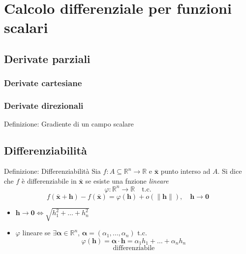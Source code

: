 \documentclass[x11names]{article}
\begin{document}

\newpage
\section{Calcolo differenziale per funzioni scalari}
	
	
	\subsection{Derivate parziali}
	
		\subsubsection{Derivate cartesiane}
		\subsubsection{Derivate direzionali}

		\begin{center}
		\colorbox{myblue}{\begin{minipage}{5.75in}
			\begin{blues}{Definizione: Gradiente di un campo scalare}
			\end{blues}
		\end{minipage}}       
		\end{center}

	\subsection{Differenziabilità}
		\begin{center}
		\colorbox{myblue}{\begin{minipage}{5.75in}
			\begin{blues}{Definizione: Differenziabilità}
				Sia \(f: A\subseteq \mathbb{R}^n \to \mathbb{R}\) e \(\boldsymbol{\bar{x}}\) punto interso ad \(A\). Si dice che \(f\) è differenziabile in \(\boldsymbol{\bar{x}}\) se esiste una fnzione \textit{lineare}
				\[ 
				\varphi: \mathbb{R}^n \to \mathbb{R} \quad \text{t.c.}
				\]
				\[ 
				f(\boldsymbol{\bar{x}} + \boldsymbol{h}) - f(\boldsymbol{\bar{x}}) = \varphi(\boldsymbol{h}) + o(\|\boldsymbol{h}\|), \quad \boldsymbol{h} \to \boldsymbol{0} 
				\]
				\begin{itemize}
					\item \(\boldsymbol{h} \to \boldsymbol{0} \Longleftrightarrow \sqrt{h_{1}^2 + \dots + h_{n}^2}\)
					\item \(\varphi\) lineare se \(\exists \boldsymbol{\alpha} \in \mathbb{R}^n\), \(\boldsymbol{\alpha} = (\alpha_1, \dots, \alpha_{n})\) t.c. 
					\[ 
					\varphi(\boldsymbol{h}) = \boldsymbol{\alpha} \cdot \boldsymbol{h} = \alpha_1 h_{1} + \dots + \alpha_n h_{n}
					\]
					\[ 
					\text{differenziabile}
					\]
				\end{itemize}
			\end{blues}
		\end{minipage}}       
		\end{center}
\end{document}

